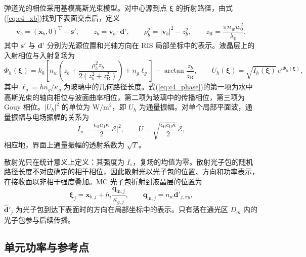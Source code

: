 弹道光的相位采用基模高斯光束模型。对中心源到点 $\boldsymbol\xi$ 的折射路径，由式(\ref{eq:c4_xb})找到下表面交点后，定义
\begin{equation}
\mathbf v_b=(\mathbf x_b,0)^{\mathrm T}-\mathbf s',\qquad
z_b=\mathbf v_b\cdot\mathbf d',\qquad
\rho_b^2=|\mathbf v_b|^2-z_b^2,\qquad
z_{\mathrm R}=\frac{\pi n_ww_0^2}{\lambda_0},
\label{eq:c4_gauss_par}
\end{equation}
其中 $\mathbf s'$ 与 $\mathbf d'$ 分别为光源位置和光轴方向在 RIS 局部坐标中的表示。液晶层上的入射相位与入射复场为
\begin{equation}
\Phi_h(\boldsymbol\xi)=k_0\left[n_w\left(z_b+\frac{\rho_b^2z_b}{2(z_b^2+z_{\mathrm R}^2)}\right)+n_g\ell_g\right]-\arctan\frac{z_b}{z_{\mathrm R}},\qquad
U_h(\boldsymbol\xi)=\sqrt{I_h(\boldsymbol\xi)}\,e^{i\Phi_h(\boldsymbol\xi)},
\label{eq:c4_phase}
\end{equation}
其中 $\ell_g=hn_g/\kappa_g$ 为玻璃中的几何路径长度。式(\ref{eq:c4_phase})的第一项为水中高斯光束的轴向相位与波面曲率相位，第二项为玻璃中的传播相位，第三项为 Gouy 相位。$|U_h|^2$ 的单位为 $\mathrm{W/m^2}$，即 $U_h$ 为通量振幅。对单个局部平面波，通量振幅与电场振幅的关系为
\begin{equation}
I_n=\frac{\epsilon_0c_0\kappa}{2}|\mathcal E|^2,\qquad U=\sqrt{\frac{\epsilon_0c_0\kappa}{2}}\,\mathcal E,
\label{eq:c4_flux}
\end{equation}
相应地，界面上通量振幅的透射系数为 $\sqrt T$。

散射光只在统计意义上定义：其强度为 $I_s$，复场的均值为零。散射光子包的随机路径长度不对应确定的相干相位，因此散射光以光子包的位置、方向和功率表示，在接收面以非相干强度叠加。MC 光子包折射到液晶层的位置为
\begin{equation}
\boldsymbol\xi_j=\mathbf x_{b,j}+h_i\frac{\mathbf q_{\mathrm{in},j}}{\kappa_{g,j}},\qquad \mathbf q_{\mathrm{in},j}=n_w\hat{\mathbf d}'_{j,xy},
\label{eq:c4_packet}
\end{equation}
$\hat{\mathbf d}'_j$ 为光子包到达下表面时的方向在局部坐标中的表示。只有落在通光区 $D_m$ 内的光子包参与后续传播。

\subsection{单元功率与参考点}

